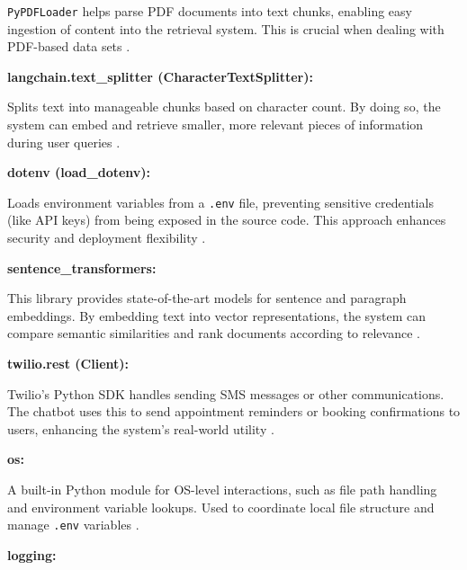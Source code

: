 \noindent
\texttt{PyPDFLoader} helps parse PDF documents into text chunks, enabling easy ingestion of content into the retrieval 
system. This is crucial when dealing with PDF-based data sets \cite{langchain}.

\vspace{0.4cm}
\noindent\textbf{langchain.text\_splitter (CharacterTextSplitter):}

\noindent
Splits text into manageable chunks based on character count. By doing so, the system can embed and retrieve smaller, 
more relevant pieces of information during user queries \cite{langchain}.

\vspace{0.4cm}
\noindent\textbf{dotenv (load\_dotenv):}

\noindent
Loads environment variables from a \texttt{.env} file, preventing sensitive credentials (like API keys) from 
being exposed in the source code. This approach enhances security and deployment flexibility \cite{dotenv}.

\vspace{0.4cm}
\noindent\textbf{sentence\_transformers:}

\noindent
This library provides state-of-the-art models for sentence and paragraph embeddings. By embedding text into vector 
representations, the system can compare semantic similarities and rank documents according to relevance \cite{sentence_transformers}.

\vspace{0.4cm}
\noindent\textbf{twilio.rest (Client):}

\noindent
Twilio’s Python SDK handles sending SMS messages or other communications. The chatbot uses this to send appointment 
reminders or booking confirmations to users, enhancing the system’s real-world utility \cite{sentence_transformers}.

\vspace{0.4cm}
\noindent\textbf{os:}

\noindent
A built-in Python module for OS-level interactions, such as file path handling and environment variable lookups. 
Used to coordinate local file structure and manage \texttt{.env} variables \cite{os}.

\vspace{0.4cm}
\noindent\textbf{logging:}

